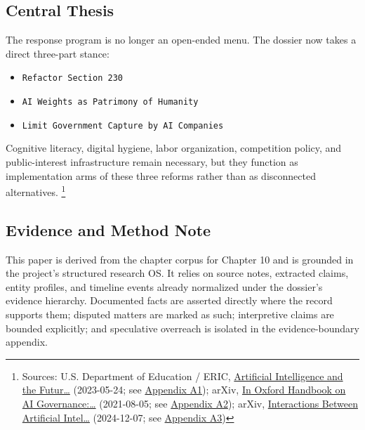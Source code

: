 \documentclass[
  american,
  11pt,
  letterpaper,
]{article}
\providecommand{\tightlist}{%
  \setlength{\itemsep}{0pt}\setlength{\parskip}{0pt}}
\begin{document}
\subsection{Central Thesis}\label{central-thesis}

The response program is no longer an open-ended menu. The dossier now
takes a direct three-part stance:

\begin{itemize}
\tightlist
\item
  \texttt{Refactor\ Section\ 230}
\item
  \texttt{AI\ Weights\ as\ Patrimony\ of\ Humanity}
\item
  \texttt{Limit\ Government\ Capture\ by\ AI\ Companies}
\end{itemize}

Cognitive literacy, digital hygiene, labor organization, competition
policy, and public-interest infrastructure remain necessary, but they
function as implementation arms of these three reforms rather than as
disconnected alternatives. \footnote{Sources: U.S. Department of
  Education / ERIC, \href{https://eric.ed.gov/?id=ED631097}{Artificial
  Intelligence and the Futur\ldots{}} (2023-05-24; see
  \hyperref[appendix-a1-artificial-intelligence-and-the-future-of-teaching-and-learning-insights-and-recommendations]{Appendix
  A1}); arXiv, \href{https://arxiv.org/abs/2108.07700}{In Oxford
  Handbook on AI Governance:\ldots{}} (2021-08-05; see
  \hyperref[appendix-a2-in-oxford-handbook-on-ai-governance-the-role-of-workers-in-ai-ethics-and-governance]{Appendix
  A2}); arXiv, \href{https://arxiv.org/abs/2412.05761}{Interactions
  Between Artificial Intel\ldots{}} (2024-12-07; see
  \hyperref[appendix-a3-interactions-between-artificial-intelligence-and-digital-public-infrastructure-concepts-benefits-and-challenges]{Appendix
  A3})}

\subsection{Evidence and Method Note}\label{evidence-and-method-note}

This paper is derived from the chapter corpus for Chapter 10 and is
grounded in the project's structured research OS. It relies on source
notes, extracted claims, entity profiles, and timeline events already
normalized under the dossier's evidence hierarchy. Documented facts are
asserted directly where the record supports them; disputed matters are
marked as such; interpretive claims are bounded explicitly; and
speculative overreach is isolated in the evidence-boundary appendix.
\end{document}
